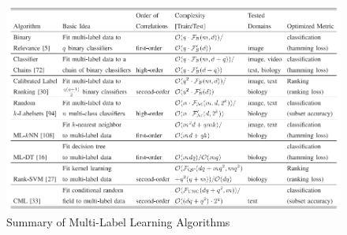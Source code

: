 \documentclass[12pt]{report}
\begin{document}
	 \begin{figure}[H]
	 	\centering
	 	\includegraphics[width=1\textwidth]{summary.png}
	 	\caption{Summary of Multi-Label Learning Algorithms}
	 	\centering
	 \end{figure}
 
\end{document}
